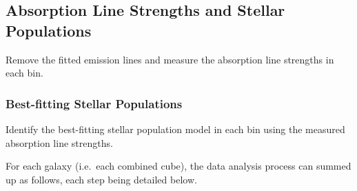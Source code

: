 \documentclass[fleqn,usenatbib,useAMS]{mnras}
\begin{document}
		

	\subsection{Absorption Line Strengths and Stellar Populations}
		\label{subsec:absorption}
		Remove the fitted emission lines and measure the absorption line strengths in each bin. %




		\subsubsection{Best-fitting Stellar Populations}
			\label{subsubsec:stellarPop}
			Identify the best-fitting stellar population model in each bin using the measured absorption line strengths.
	
	





	For each galaxy (i.e.\ each combined cube), the data analysis process can summed up as follows, each step being detailed below.



	



\end{document}
